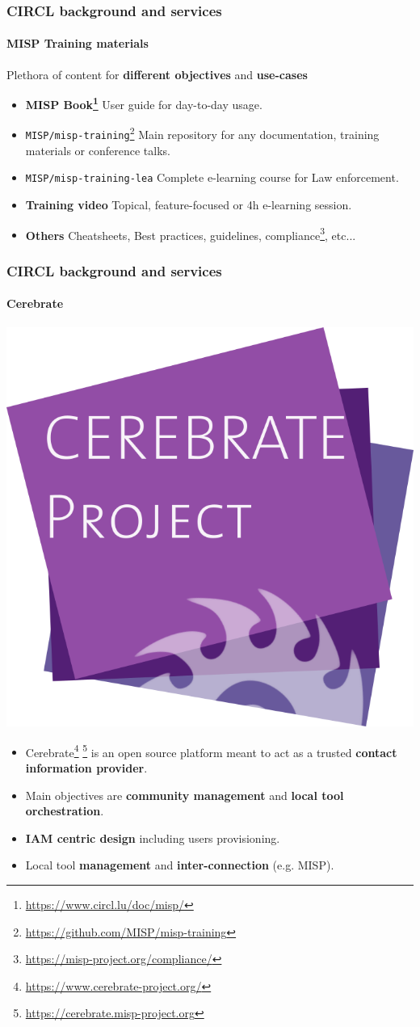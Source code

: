 \begin{frame}
	\frametitle{CIRCL background and services}
	\framesubtitle{MISP Training materials}
Plethora of content for \textbf{different objectives} and \textbf{use-cases}
    \begin{itemize}
        \item \textbf{MISP Book\footnote{\url{https://www.circl.lu/doc/misp/}}} User guide for day-to-day usage.
        \item \texttt{MISP/misp-training}\footnote{\url{https://github.com/MISP/misp-training}} Main repository for any documentation, training materials or conference talks.
        \item \texttt{MISP/misp-training-lea} Complete e-learning course for Law enforcement.
        \item \textbf{Training video} Topical, feature-focused or 4h e-learning session.
        \item \textbf{Others} Cheatsheets, Best practices, guidelines, compliance\footnote{\url{https://misp-project.org/compliance/}}, etc... 
    \end{itemize}
\end{frame}

\begin{frame}
	\frametitle{CIRCL background and services}
	\framesubtitle{Cerebrate}
    \begin{center}
        \includegraphics[width=0.20\linewidth]{pictures/cerebrate-logo.png}
    \end{center}
    \begin{itemize}
        \item Cerebrate\footnote{\url{https://www.cerebrate-project.org/}} \footnote{\url{https://cerebrate.misp-project.org}} is an open source platform meant to act as a trusted \textbf{contact information provider}.
        \item Main objectives are \textbf{community management} and \textbf{local tool orchestration}.
        \item \textbf{IAM centric design} including users provisioning.
        \item Local tool \textbf{management} and \textbf{inter-connection} (e.g. MISP).
    \end{itemize}
\end{frame}


